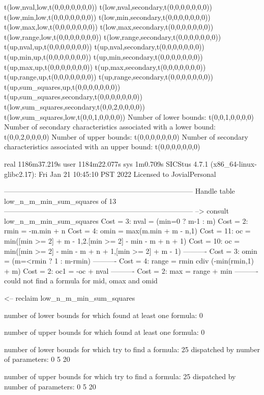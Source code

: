 t(low,nval,low,t(0,0,0,0,0,0,0))
t(low,nval,secondary,t(0,0,0,0,0,0,0))
t(low,min,low,t(0,0,0,0,0,0,0))
t(low,min,secondary,t(0,0,0,0,0,0,0))
t(low,max,low,t(0,0,0,0,0,0,0))
t(low,max,secondary,t(0,0,0,0,0,0,0))
t(low,range,low,t(0,0,0,0,0,0,0))
t(low,range,secondary,t(0,0,0,0,0,0,0))
t(up,nval,up,t(0,0,0,0,0,0,0))
t(up,nval,secondary,t(0,0,0,0,0,0,0))
t(up,min,up,t(0,0,0,0,0,0,0))
t(up,min,secondary,t(0,0,0,0,0,0,0))
t(up,max,up,t(0,0,0,0,0,0,0))
t(up,max,secondary,t(0,0,0,0,0,0,0))
t(up,range,up,t(0,0,0,0,0,0,0))
t(up,range,secondary,t(0,0,0,0,0,0,0))
t(up,sum_squares,up,t(0,0,0,0,0,0,0))
t(up,sum_squares,secondary,t(0,0,0,0,0,0,0))
t(low,sum_squares,secondary,t(0,0,2,0,0,0,0))
t(low,sum_squares,low,t(0,0,1,0,0,0,0))
Number of lower bounds:                                             t(0,0,1,0,0,0,0)
Number of secondary characteristics associated with a lower bound:  t(0,0,2,0,0,0,0)
Number of upper bounds:                                             t(0,0,0,0,0,0,0)
Number of secondary characteristics associated with an upper bound: t(0,0,0,0,0,0,0)

real	1186m37.219s
user	1184m22.077s
sys	1m0.709s
SICStus 4.7.1 (x86_64-linux-glibc2.17): Fri Jan 21 10:45:10 PST 2022
Licensed to JovialPersonal


--------------------------------------------------------------------------------
Handle table low_n_m_min_sum_squares of 13
--------------------------------------------------------------------------------
--> consult low_n_m_min_sum_squares
Cost =  3:  nval  = (min=0 ? m-1 : m)
Cost =  2:  rmin  = -m.min + n
Cost =  4:  omin  = max(m.min + m - n,1)
Cost = 11:  oc    = min([min >= 2] + m - 1,2.[min >= 2] - min - m + n + 1)
Cost = 10:  oc    = min([min >= 2] - min - m + n + 1,[min >= 2] + m - 1)
----------
Cost =  3:  omin  = (m=<rmin ? 1 : m-rmin)
----------
Cost =  4:  range = rmin cdiv (-min(rmin,1) + m)
Cost =  2:  oc1   = -oc + nval
----------
Cost =  2:  max   = range + min
----------
could not find a formula for mid, omax and omid

<-- reclaim low_n_m_min_sum_squares

number of lower bounds for which found at least one formula: 0

number of upper bounds for which found at least one formula: 0

number of lower bounds for which try to find a formula: 25
dispatched by number of parameters: 0  5  20

number of upper bounds for which try to find a formula: 25
dispatched by number of parameters: 0  5  20


